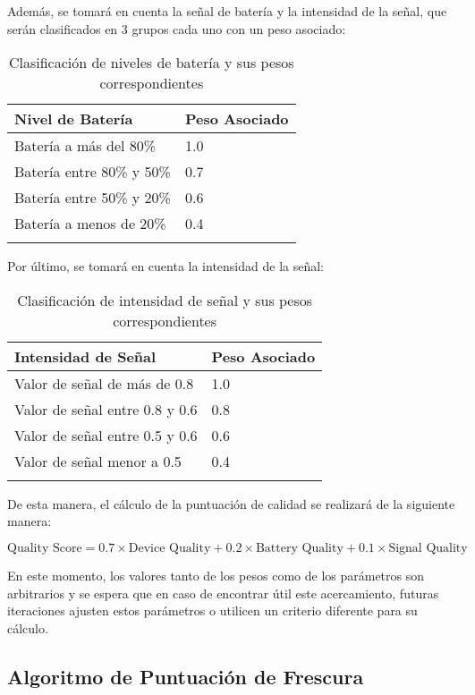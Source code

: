 Además, se tomará en cuenta la señal de batería y la intensidad de la señal, que serán clasificados en 3 grupos cada uno con un peso asociado:

\begin{longtable}{|p{6cm}|p{3cm}|}
    \hline
    \textbf{Nivel de Batería} & \textbf{Peso Asociado} \\
    \hline
    \endhead
    Batería a más del 80\% & 1.0 \\
    \hline
    Batería entre 80\% y 50\% & 0.7 \\
    \hline
    Batería entre 50\% y 20\% & 0.6 \\
    \hline
    Batería a menos de 20\% & 0.4 \\
    \hline
    \caption{Clasificación de niveles de batería y sus pesos correspondientes}
    \label{tab:bateria}
\end{longtable}

Por último, se tomará en cuenta la intensidad de la señal:
\begin{longtable}{|p{6cm}|p{3cm}|}
    \hline
    \textbf{Intensidad de Señal} & \textbf{Peso Asociado} \\
    \hline
    \endhead
    Valor de señal de más de 0.8 & 1.0 \\
    \hline
    Valor de señal entre 0.8 y 0.6 & 0.8 \\
    \hline
    Valor de señal entre 0.5 y 0.6 & 0.6 \\
    \hline
    Valor de señal menor a 0.5 & 0.4 \\
    \hline
    \caption{Clasificación de intensidad de señal y sus pesos correspondientes}
    \label{tab:senal}
\end{longtable}

\newpage
De esta manera, el cálculo de la puntuación de calidad se realizará de la siguiente manera:


\begin{equation}
    \text{Quality Score} = 0.7 \times \text{Device Quality} + 0.2 \times \text{Battery Quality} + 0.1 \times \text{Signal Quality}
\end{equation}


En este momento, los valores tanto de los pesos como de los parámetros son arbitrarios y se espera que en caso de encontrar útil este acercamiento, 
futuras iteraciones ajusten estos parámetros o utilicen un criterio diferente para su cálculo.

\newpage

\subsection{Algoritmo de Puntuación de Frescura}

